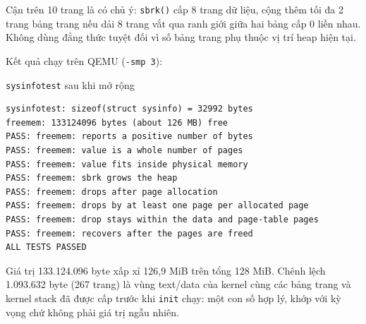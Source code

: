 Cận trên 10 trang là có chủ ý: \texttt{sbrk()} cấp 8 trang dữ liệu, cộng thêm tối đa 2 trang bảng trang nếu dải 8 trang vắt qua ranh giới giữa hai bảng cấp 0 liền nhau. Không dùng đẳng thức tuyệt đối vì số bảng trang phụ thuộc vị trí heap hiện tại.

Kết quả chạy trên QEMU (\texttt{-smp 3}):

\begin{codebox}[sysinfotest2]{\texttt{sysinfotest} sau khi mở rộng}
    \begin{verbatim}
sysinfotest: sizeof(struct sysinfo) = 32992 bytes
freemem: 133124096 bytes (about 126 MB) free
PASS: freemem: reports a positive number of bytes
PASS: freemem: value is a whole number of pages
PASS: freemem: value fits inside physical memory
PASS: freemem: sbrk grows the heap
PASS: freemem: drops after page allocation
PASS: freemem: drops by at least one page per allocated page
PASS: freemem: drop stays within the data and page-table pages
PASS: freemem: recovers after the pages are freed
ALL TESTS PASSED
    \end{verbatim}
\end{codebox}

Giá trị 133.124.096 byte xấp xỉ 126,9 MiB trên tổng 128 MiB. Chênh lệch 1.093.632 byte (267 trang) là vùng text/data của kernel cùng các bảng trang và kernel stack đã được cấp trước khi \texttt{init} chạy: một con số hợp lý, khớp với kỳ vọng chứ không phải giá trị ngẫu nhiên.
